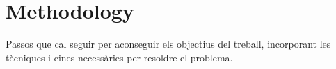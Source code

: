 \chapter{Methodology}

Passos que cal seguir per aconseguir els objectius del treball, incorporant les tècniques i eines necessàries per resoldre el problema.

